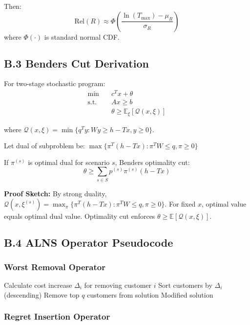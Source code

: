 Then:
\begin{equation}
\text{Rel}(R) \approx \Phi\left(\frac{\ln(T_{\max}) - \mu_R}{\sigma_R}\right)
\end{equation}
where $\Phi(\cdot)$ is standard normal CDF.

\subsection{B.3 Benders Cut Derivation}

For two-stage stochastic program:
\begin{align}
\min \quad & c^T x + \theta \\
\text{s.t.} \quad & Ax \geq b \\
& \theta \geq \mathbb{E}_\xi[\mathcal{Q}(x, \xi)]
\end{align}

where $\mathcal{Q}(x, \xi) = \min\{q^T y : Wy \geq h - Tx, y \geq 0\}$.

Let dual of subproblem be: $\max\{\pi^T(h - Tx) : \pi^T W \leq q, \pi \geq 0\}$

If $\pi^{(s)}$ is optimal dual for scenario $s$, Benders optimality cut:
\begin{equation}
\theta \geq \sum_{s \in S} p^{(s)} \pi^{(s)} (h - Tx)
\end{equation}

\textbf{Proof Sketch:} By strong duality, $\mathcal{Q}(x, \xi^{(s)}) = \max_\pi \{\pi^T(h - Tx) : \pi^T W \leq q, \pi \geq 0\}$. For fixed $x$, optimal value equals optimal dual value. Optimality cut enforces $\theta \geq \mathbb{E}[\mathcal{Q}(x, \xi)]$.

\subsection{B.4 ALNS Operator Pseudocode}

\subsubsection{Worst Removal Operator}

\begin{algorithmic}[1]
\STATE Calculate cost increase $\Delta_i$ for removing customer $i$
\STATE Sort customers by $\Delta_i$ (descending)
\STATE Remove top $q$ customers from solution
\RETURN Modified solution
\ENDPROCEDURE
\end{algorithmic}

\subsubsection{Regret Insertion Operator}

